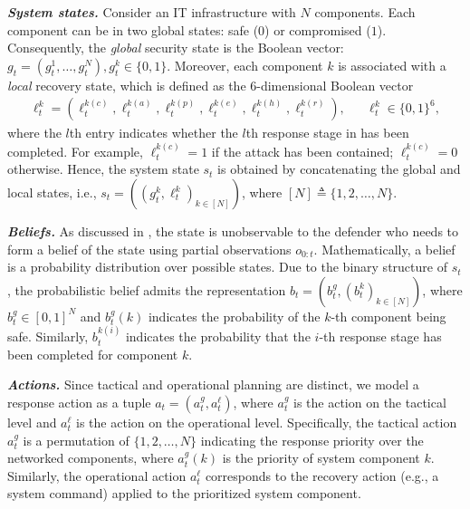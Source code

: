\documentclass[runningheads,10pt]{llncs}
\begin{document}
\noindent\textit{\textbf{System states.}}
Consider an IT infrastructure with $N$ components. Each component can be in two global states: safe ($0$) or compromised ($1$). Consequently, the \textit{global} security state is the Boolean vector: $g_t=(g^1_t, \ldots, g_t^N),  g^k_t\in \{0, 1\}$. Moreover, each component $k$ is associated with a \textit{local} recovery state, which is defined as the 6-dimensional Boolean vector
\begin{align*}
\ell^k_t=(\ell^{k(c)}_t, \ell^{k(a)}_t, \ell^{k(p)}_t, \ell^{k(e)}_t, \ell^{k(h)}_t, \ell^{k(r)}_t), && \ell^k_t\in \{0, 1\}^6,
\end{align*}
where the $l$th entry indicates whether the $l$th response stage in  has been completed. For example, $\ell^{k(c)}_t=1$ if the attack has been contained; $\ell^{k(c)}_t=0$ otherwise. Hence, the system state $s_t$ is obtained by concatenating the global and local states, i.e., $s_t=((g_t^k,\ell_t^k)_{k\in [N]})$, where $[N] \triangleq \{1,2,\ldots, N\}$.

\noindent\textit{\textbf{Beliefs.}}
As discussed in , the state is unobservable to the defender who needs to form a belief of the state using partial observations $o_{0:t}$. Mathematically, a belief is a probability distribution over possible states. Due to the binary structure of $s_t$, the probabilistic belief admits the representation $b_t=(b_t^g, (b_t^k)_{k\in [N]})$, where $b_t^g\in [0,1]^N$ and $b_t^g(k)$ indicates the probability of the $k$-th component being safe. Similarly, $b_t^{k(i)}$ indicates the probability that the $i$-th response stage has been completed for component $k$.

\noindent\textit{\textbf{Actions.}}
Since tactical and operational planning are distinct, we model a response action as a tuple $a_t=(a_t^g, a_t^{\ell})$, where $a_t^g$ is the action on the tactical level and $a_t^{\ell}$ is the action on the operational level. Specifically, the tactical action $a_t^g$ is a permutation of $\{1,2, \ldots, N\}$ indicating the response priority over the networked components, where $a_t^g(k)$ is the priority of system component $k$. Similarly, the operational action $a_t^{\ell}$ corresponds to the recovery action (e.g., a system command) applied to the prioritized system component.
\end{document}
